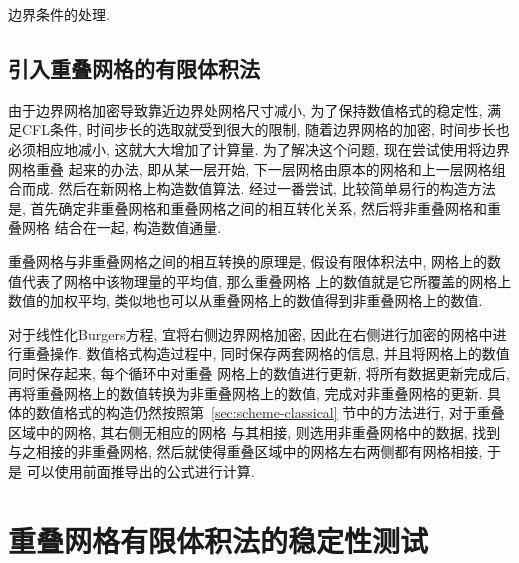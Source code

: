 \documentclass[hyperref,UTF8,titlepage]{ctexart}
\begin{document}
边界条件的处理.


\subsection{引入重叠网格的有限体积法}
由于边界网格加密导致靠近边界处网格尺寸减小, 为了保持数值格式的稳定性, 满足CFL条件, 时间步长的选取就受到很大的限制,
随着边界网格的加密, 时间步长也必须相应地减小, 这就大大增加了计算量. 为了解决这个问题, 现在尝试使用将边界网格重叠
起来的办法, 即从某一层开始, 下一层网格由原本的网格和上一层网格组合而成. 然后在新网格上构造数值算法.
经过一番尝试, 比较简单易行的构造方法是, 首先确定非重叠网格和重叠网格之间的相互转化关系, 然后将非重叠网格和重叠网格
结合在一起, 构造数值通量.

重叠网格与非重叠网格之间的相互转换的原理是, 假设有限体积法中, 网格上的数值代表了网格中该物理量的平均值, 那么重叠网格
上的数值就是它所覆盖的网格上数值的加权平均, 类似地也可以从重叠网格上的数值得到非重叠网格上的数值.

对于线性化Burgers方程, 宜将右侧边界网格加密, 因此在右侧进行加密的网格中进行重叠操作.
数值格式构造过程中, 同时保存两套网格的信息, 并且将网格上的数值同时保存起来, 每个循环中对重叠
网格上的数值进行更新, 将所有数据更新完成后, 再将重叠网格上的数值转换为非重叠网格上的数值, 完成对非重叠网格的更新.
具体的数值格式的构造仍然按照第~\ref{sec:scheme-classical} 节中的方法进行, 对于重叠区域中的网格, 其右侧无相应的网格
与其相接, 则选用非重叠网格中的数据, 找到与之相接的非重叠网格, 然后就使得重叠区域中的网格左右两侧都有网格相接, 于是
可以使用前面推导出的公式进行计算. 




\section{重叠网格有限体积法的稳定性测试}
\end{document}
